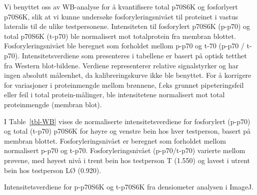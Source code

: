 \documentclass[
  letterpaper,
  DIV=11,
  numbers=noendperiod]{scrreprt}
\begin{document}
Vi benyttet oss av WB-analyse for å kvantifisere total p70S6K og
fosforlyert p70S6K, slik at vi kunne undersøke fosforyleringsnivået til
proteinet i vastus lateralis til de ulike testpersonene. Intensiteten
til fosforylert p70S6K (p-p70) og total p70S6K (t-p70) ble normalisert
mot totalprotein fra membran blottet. Fosforyleringsnivået ble beregnet
som forholdet mellom p-p70 og t-70 (p-p70 / t-p70). Intensitetsverdiene
som presenteres i tabellene er basert på optisk tetthet fra Western
blot-bildene. Verdiene representerer relative signalstyrker og har ingen
absolutt måleenhet, da kalibreringskurve ikke ble benyttet. For å
korrigere for variasjoner i proteinmengde mellom brønnene, f.eks grunnet
pipeteringsfeil eller feil i total protein-målinger, ble intensitetene
normalisert mot total proteinmengde (membran blot).

I Table~\ref{tbl-WB} vises de normaliserte intensitetsverdiene for
fosforylert (p-p70) og total (t-p70) p70S6K for høyre og venstre bein
hos hver testperson, basert på membran blottet. Fosforyleringsnivået er
beregnet som forholdet mellom normalisert p-p70 og t-p70.
Fosforyleringsnivået (p-p70/t-p70) varierte mellom prøvene, med høyest
nivå i trent bein hos testperson T (1.550) og lavest i utrent bein hos
testperson LØ (0.920).

\begin{table}

\caption{\label{tbl-WB}Intensitetsverdiene for p-p70S6K og t-p70S6K fra
densiometer analysen i ImageJ.}


\end{table}%
\end{document}
